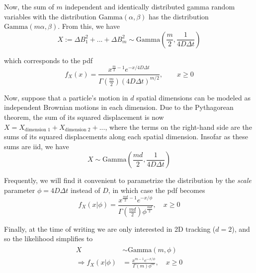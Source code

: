 \documentclass{article}
\begin{document}
Now, the sum of $m$ independent and identically distributed gamma random variables
with the distribution $\text{Gamma} \left( \alpha, \beta \right)$ has the distribution
$\text{Gamma} \left( m \alpha, \beta \right)$. From this, we have
\begin{equation}
    X := \Delta B_{1}^{2} + ... + \Delta B_{m}^{2} \sim \text{Gamma} \left(
        \frac{m}{2}, \frac{1}{4 D \Delta t}
    \right)
\end{equation}

which corresponds to the pdf
\begin{equation}
    f_{X}(x) = \frac{x^{\frac{m}{2}-1} e^{-x / 4 D \Delta t}}{\Gamma \left( \frac{m}{2} \right) \left( 4 D \Delta t \right)^{m/2}}, \qquad x \geq 0
\end{equation}

Now, suppose that a particle's motion in $d$ spatial dimensions can be
modeled as independent Brownian motions in each dimension. Due to the Pythagorean
theorem, the sum of its squared displacement is now
$X = X_{\text{dimension 1}} + X_{\text{dimension 2}} + ...$, where
the terms on the right-hand side are the sums of its squared displacements along
each spatial dimension. Insofar as these sums are iid, we have
\begin{equation}\label{eq:brownian_likelihood}
    X \sim \text{Gamma} \left( \frac{md}{2}, \frac{1}{4 D \Delta t} \right)
\end{equation}

Frequently, we will find it convenient to parametrize the distribution by
the \emph{scale} parameter $\phi = 4 D \Delta t$ instead of $D$,
in which case the pdf becomes
\begin{equation}\label{eq:brownian_likelihood_2}
    f_{X}(x | \phi) = \frac{x^{\frac{md}{2} - 1} e^{-x / \phi}}{\Gamma \left( \frac{md}{2} \right) \phi^{\frac{md}{2}}}, \quad x \geq 0
\end{equation}

Finally, at the time of writing we are only interested in 2D tracking ($d=2$),
and so the likelihood simplifies to
\begin{align}\begin{split}\label{eq:brownian_likelihood_3}
    X &\sim \text{Gamma} \left( m, \phi \right) \\
    \Rightarrow f_{X}(x | \phi) &= \frac{x^{m-1} e^{-x/\phi}}{\Gamma (m) \phi^{m}}, \quad x \geq 0
\end{split}\end{align}
\end{document}
